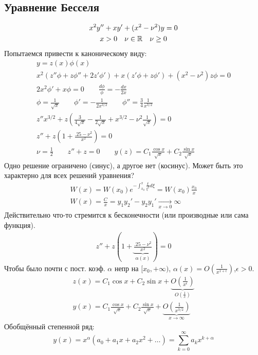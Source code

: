 \documentclass{article}
\begin{document}
\subsection{Уравнение Бесселя}
\begin{gather*}
  x^{2}y''+xy'+(x^{2}-\nu^{2})y=0 \\ 
  x>0 \quad \nu \in \mathbb{R} \quad \nu \ge 0
\end{gather*}
Попытаемся привести к каноническому виду:
\begin{gather*}
  y=z(x)\phi(x) \\ 
  x^{2}(z''\phi+z\phi''+2z'\phi')+x(z'\phi+z\phi')+(x^{2}-\nu^{2})z\phi=0 \\ 
  2x^{2}\phi'+x\phi=0 \qquad \frac{d \phi}{\phi}=-\frac{dx}{2x} \\ 
  \phi = \frac{1}{\sqrt{x}} \qquad \phi'=-\frac{1}{2x^{3/2}} \qquad \phi''=\frac{3}{4}\frac{1}{x^{3/2}} \\
  z''x^{3/2}+z\left(\frac{3}{4\sqrt{x}}-\frac{1}{2\sqrt{x}}+x^{3/2}-\nu^{2}\frac{1}{\sqrt{x}}\right) =0 \\ 
  z''+z\left(1+\frac{.25-\nu^{2}}{x^{2}}\right)=0 \\ 
  \nu=\frac{1}{2} \qquad z''+z=0 \qquad y(z)=C_1\frac{\cos x}{\sqrt{x}}+C_2\frac{\sin x}{\sqrt{x}}
\end{gather*}
Одно решение ограничено (синус), а другое нет (косинус).
Может быть это характерно для всех решений уравнения?
\begin{gather*}
  W(x)=W(x_0)e^{-\int_{x_0}^{x}\frac{\xi}{\xi^{2}}d\xi}=W(x_{0})\frac{x_{0}}{x} \\ 
  W(x)=\frac{C}{x}=y_1y_2'-y_2y_1' \underset{x\to 0}{\to} \infty
\end{gather*}
Действительно что-то стремится к бесконечности (или производные или сама функция).
\begin{gather*}
  z''+z(1+\underbrace{\frac{.25-\nu^{2}}{x^{2}}}_{\alpha(x)})=0
\end{gather*}
Чтобы было почти с пост. коэф. $\alpha$ непр на $[x_{0},+\infty)$,
$\alpha(x)=O\left(\frac{1}{x^{1+\epsilon}}\right)$,$\epsilon>0$.
\begin{gather*}
  z(x)=C_1\cos x + C_2\sin x + \underbrace{O\left(\frac{1}{x^{\epsilon}}\right)}_{O\left(\frac{1}{x}\right) } \\ 
  y(x)=C_1\frac{\cos x}{\sqrt{x}} + C_2 \frac{\sin x}{\sqrt{x}} + \underbrace{O\left(\frac{1}{x^{3/2}}\right)}_{x\to\infty}
\end{gather*}
Обобщённый степенной ряд:
\[
  y(x)=x^{\alpha}(a_0+a_1x+a_2x^{2}+\dots )=\sum_{k=0}^{\infty}a_kx^{k+\alpha}
\]
\end{document}
